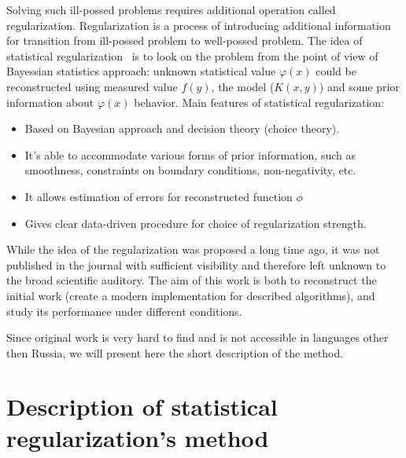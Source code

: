 \documentclass{webofc}
\begin{document}
Solving such ill-possed problems requires additional operation called regularization. Regularization is a process of introducing additional information for transition from ill-possed problem to well-possed problem. The idea of statistical regularization~\cite{Turchin, Turovceva} is to look on the problem from the point of view of Bayessian statistics approach: unknown statistical value $\varphi(x)$ could be reconstructed using  measured value $f(y)$, the model ($K(x,y)$) and some prior information about $\varphi(x)$ behavior. Main features of statistical regularization:
\begin{itemize}
    \item Based on Bayesian approach and decision theory (choice theory).
    \item It's able to accommodate various forms of prior information, such as
      smoothness, constraints on boundary conditions, non-negativity, etc.
    \item It allows estimation of errors for reconstructed function $\phi$
    \item Gives clear data-driven procedure for choice of regularization
      strength.
\end{itemize}

While the idea of the regularization was proposed a long time ago, it was not published in the journal with sufficient visibility and therefore left unknown to the broad scientific auditory. The aim of this work is both to reconstruct the initial work (create a modern implementation for described algorithms), and study its performance under different conditions.

Since original work is very hard to find and is not accessible in languages other then Russia, we will present here the short description of the method.

\section{Description of statistical regularization's method}
\end{document}
